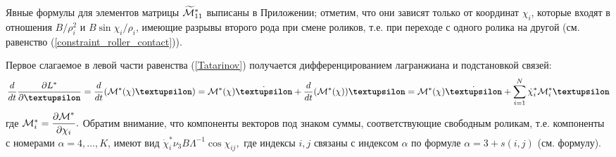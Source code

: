 
Явные формулы для элементов матрицы $\widetilde{\mathcal{M}}^*_{11}$ выписаны в Приложении; отметим, что они зависят только от координат $\chi_i$, которые входят в отношения $B/\rho_i^2$ и $B\sin\chi_i/\rho_i$, имеющие разрывы второго рода при смене роликов, т.е. при переходе с одного ролика на другой (см. равенство (\ref{constraint_roller_contact})).

Первое слагаемое в левой части равенства (\ref{Tatarinov}) получается дифференцированием лагранжиана и подстановкой связей:
\begin{equation}\label{DLStarDnuDdt}
    \frac{d}{dt}\frac{\partial L^{*}}{\partial \vnu} = \frac{d}{dt}(\M^*(\chi)\vnu) = 
    \M^*(\chi)\dot{\vnu} +
    \frac{d}{dt}(\M^*(\chi))\vnu =
    \M^*(\chi)\dot{\vnu} +
    \sum_{i=1}^{N}\dot{\chi}_i^*\M^*_i\vnu
\end{equation}
где $\mathcal{M}^*_i = \displaystyle\frac{\displaystyle \partial \mathcal{M}^*}{\displaystyle \partial \chi_i}.$ Обратим внимание, что компоненты векторов под знаком суммы, соответствующие свободным роликам, т.е. компоненты с номерами $\alpha = 4,\dots, K$, имеют вид $\dot{\chi}_i^*\nu_3B\Lambda^{-1}\cos\chi_{ij},$
где индексы $i,j$ связаны с индексом $\alpha$ по формуле $\alpha = 3 + s(i, j)$ (см. формулу).

